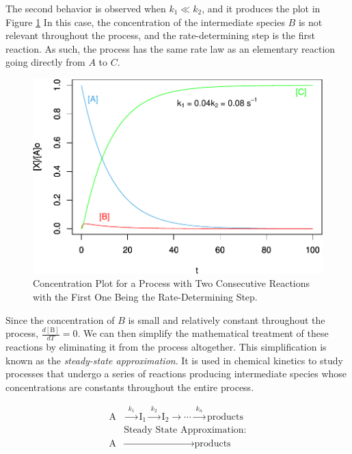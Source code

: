 \documentclass[
  9pt,
]{extbook}
\theoremstyle{definition}
\theoremstyle{definition}
\theoremstyle{definition}
\theoremstyle{definition}
\theoremstyle{remark}
\begin{document}
The second behavior is observed when \(k_1\ll k_2\), and it produces the plot in Figure \ref{fig:figk6} In this case, the concentration of the intermediate species \(B\) is not relevant throughout the process, and the rate-determining step is the first reaction. As such, the process has the same rate law as an elementary reaction going directly from \(A\) to \(C\).

\begin{figure}

{\centering \includegraphics{pchem1_files/figure-latex/figk6-1} 

}

\caption{Concentration Plot for a Process with Two Consecutive Reactions with the First One Being the Rate-Determining Step.}\label{fig:figk6}
\end{figure}

Since the concentration of \(B\) is small and relatively constant throughout the process, \(\frac{d[\mathrm{B}]}{dT}=0\). We can then simplify the mathematical treatment of these reactions by eliminating it from the process altogether. This simplification is known as the \emph{steady-state approximation}. It is used in chemical kinetics to study processes that undergo a series of reactions producing intermediate species whose concentrations are constants throughout the entire process.

\begin{equation}
\begin{aligned}
\text{A} &\xrightarrow{\;k_1\;} \text{I}_1 \xrightarrow{\;k_2\;} \text{I}_2 \xrightarrow{\quad} \cdots \xrightarrow{\;k_n\;}\text{products} \\
& \text{Steady State Approximation:} \\
\text{A}&\xrightarrow{\qquad\qquad\qquad\qquad\quad\quad\;\;}\text{products}
\end{aligned}
\label{eq:kincomp8}
\end{equation}
\end{document}
